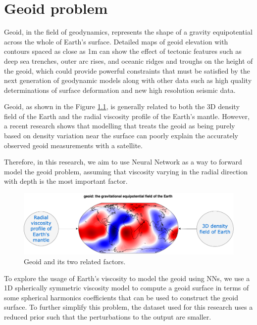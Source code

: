 \chapter{Geoid problem}\label{chap:content}

Geoid, in the field of geodynamics, represents the shape of a gravity equipotential across the whole of Earth's surface. Detailed maps of geoid elevation with contours spaced as close as 1m can show the effect of tectonic features such as deep sea trenches, outer arc rises, and oceanic ridges and troughs on the height of the geoid, which could provide powerful constraints that must be satisfied by the next generation of geodynamic models along with other data such as high quality determinations of surface deformation and new high resolution seismic data. \citep{10.1038_299104a0}

Geoid, as shown in the Figure \ref{figure:geoid_factors}, is generally related to both the 3D density field of the Earth and the radial viscosity profile of the Earth's mantle. However, a recent research shows that modelling that treats the geoid as being purely based on density variation near the surface can poorly explain the accurately observed geoid measurements with a satellite. \citep{10.1098_rsta.1989.0038}

Therefore, in this research, we aim to use Neural Network as a way to forward model the geoid problem,
assuming that viscosity varying in the radial direction with depth is the most important factor.

\begin{figure}[H]
    \centering
    \includegraphics[scale=0.4]{figures/geoid_images/Geoid.png}
    \caption{Geoid and its two related factors.}
    \label{figure:geoid_factors}
\end{figure}

To explore the usage of Earth’s viscosity to model the geoid using NNs, we use a 1D spherically symmetric viscosity model to compute a geoid surface in terms of some spherical harmonics coefficients that can be used to construct the geoid surface. To further simplify this problem, the dataset used for this research uses a reduced prior such that the perturbations to the output are smaller.


